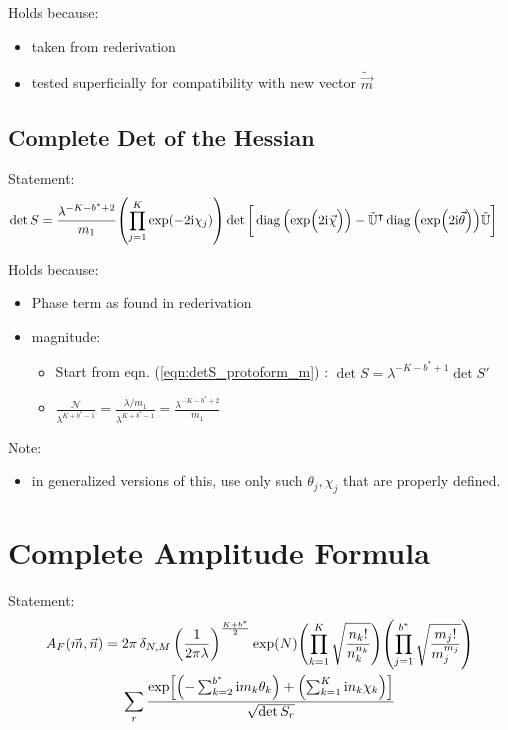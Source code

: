 \documentclass[
	english,
	a4paper,
	fontsize=10pt,
	parskip=half,
	titlepage=true,
	DIV=12,
	final
]{scrreprt}
\newcommand*{\transp}{\ensuremath{^\intercal}}
\newcommand*{\iunit}{\ensuremath{\mathrm{i}}}
\DeclareMathOperator{\diag}{diag}
\begin{document}
Holds because:
\begin{itemize}
\item taken from rederivation
\item tested superficially for compatibility with new vector $\tilde{\vec{m}}$
\end{itemize}

\subsection{Complete Det of the Hessian}
Statement:
\begin{align}
	\det S
&=
	\frac{ \lambda^{-K - b^* + 2} }{ m_1 }
	\qty( \prod_{j=1}^{K} \exp(-2\iunit \chi_j) )
	\det\qty[\bigg.
		\diag\qty(\exp(\Big.2\iunit\vec{\chi}))
		-
		\tilde{\mathbb{U}}\transp
		\diag\qty(\exp(2\iunit\vec{\theta}))
		\tilde{\mathbb{U}}
	]
\label{eqn:detSComplete_m}
\end{align}

Holds because:
\begin{itemize}
\item Phase term as found in rederivation
\item magnitude:
	\begin{itemize}
	\item Start from eqn. (\ref{eqn:detS_protoform_m}) : $\det S = \lambda^{-K - b^* + 1} \det S'$
	\item $
	\frac
		{\mathcal{N}}
		{\lambda^{K + b^* - 1}}
=
	\frac
		{\lambda / m_1}
		{\lambda^{K + b^* - 1}}
=
	\frac{\lambda^{- K - b^* + 2}}{m_1}
$	
	\end{itemize}
\end{itemize}

Note:
\begin{itemize}
\item in generalized versions of this, use only such $\theta_j, \chi_j$ that are properly defined.
\end{itemize}

\section{Complete Amplitude Formula}
Statement:
\begin{multline}
	A_F(\vec{m}, \vec{n})
=
	2\pi \, \delta_{N,M} \, \qty(
		\frac{1}{2\pi\lambda}
	)^{\frac{K + b^*}{2}}
	\exp(N)
	\qty( \prod_{k=1}^{K}
		\sqrt{\frac
			{ n_k! }
			{ n_k^{n_k} }
	})
	\qty( \prod_{j=1}^{b^*}
		\sqrt{\frac
			{ m_j! }
			{ m_j^{m_j} }
	})
\\
	\sum_r
		\frac
		{\exp[
			\qty(- \sum_{k=2}^{b^*} \iunit m_k \theta_k) + 
			\qty(  \sum_{k=1}^{K}   \iunit n_k \chi  _k)
		]}
		{\sqrt{\det S_r}}
\end{multline}
\end{document}
